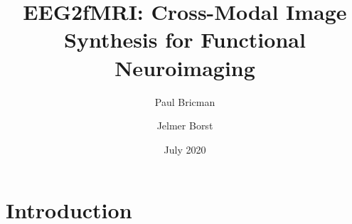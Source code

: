 \documentclass{article}
\title{EEG2fMRI: Cross-Modal Image Synthesis for Functional Neuroimaging}
\author{Paul Bricman}
\author{Jelmer Borst}
\affil{University of Groningen}
\date{July 2020}
\begin{document}
\maketitle

\section{Introduction}
\end{document}
